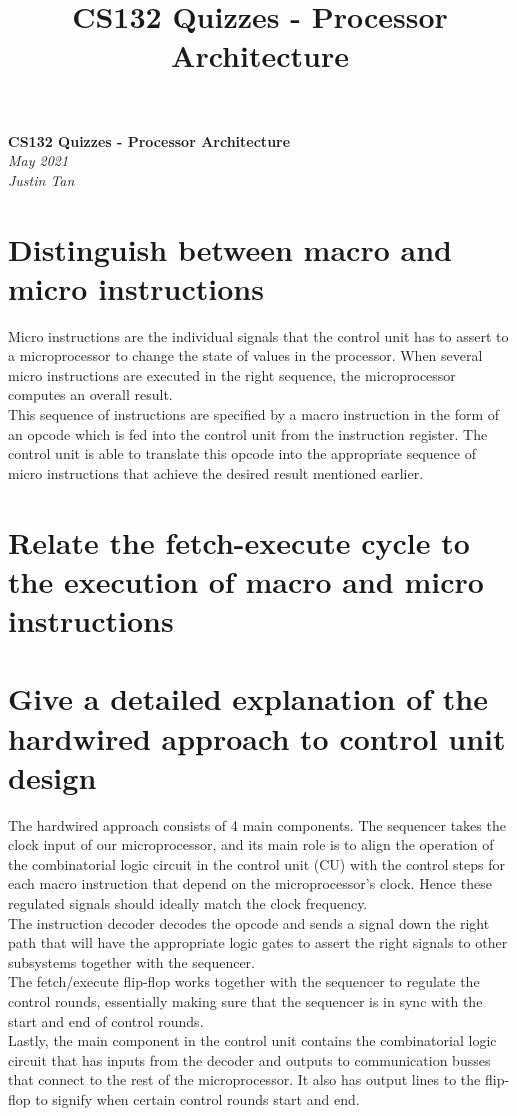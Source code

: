\documentclass{article}
\title{CS132 Quizzes - Processor Architecture}
\begin{document}
\begin{center}
    \Huge\textbf{CS132 Quizzes - Processor Architecture}\\
    \huge\textit{May 2021}\\
    \medskip
    \Large\textit{Justin Tan}
\end{center}



\section{Distinguish between macro and micro instructions}

Micro instructions are the individual signals that the control unit has to
assert to a microprocessor to change the state of values in the processor. When
several micro instructions are executed in the right sequence, the
microprocessor computes an overall result. \\
This sequence of instructions are specified by a macro instruction in the form
of an opcode which is fed into the control unit from the instruction register.
The control unit is able to translate this opcode into the appropriate sequence
of micro instructions that achieve the desired result mentioned earlier.

\section{Relate the fetch-execute cycle to the execution of macro and micro instructions}



\section{Give a detailed explanation of the hardwired approach to control unit design}

The hardwired approach consists of 4 main components. The sequencer takes the
clock input of our microprocessor, and its main role is to align the operation
of the combinatorial logic circuit in the control unit (CU) with the control
steps for each macro instruction that depend on the microprocessor's clock.
Hence these regulated signals should ideally match the clock frequency. \\
The instruction decoder decodes the opcode and sends a signal down the right
path that will have the appropriate logic gates to assert the right signals to
other subsystems together with the sequencer. \\
The fetch/execute flip-flop works together with the sequencer to regulate the
control rounds, essentially making sure that the sequencer is in sync with the
start and end of control rounds.\\
Lastly, the main component in the control unit contains the combinatorial logic
circuit that has inputs from the decoder and outputs to communication busses
that connect to the rest of the microprocessor. It also has output lines to the
flip-flop to signify when certain control rounds start and end.
\end{document}
